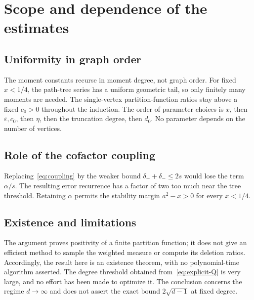 \documentclass[11pt]{article}
\numberwithin{equation}{section}
\theoremstyle{remark}
\begin{document}
\section{Scope and dependence of the estimates}

\subsection{Uniformity in graph order}
The moment constants recurse in moment degree, not graph order.
For fixed $x<1/4$, the path-tree series has a uniform geometric tail,
so only finitely many moments are needed. The single-vertex
partition-function ratios stay above a fixed $c_0>0$ throughout the
induction. The order of parameter choices is
$x$, then $\varepsilon,c_0$, then $\eta$, then the truncation degree,
then $d_0$. No parameter depends on the number of vertices.

\subsection{Role of the cofactor coupling}
Replacing~\eqref{eq:coupling} by the weaker bound
$\delta_++\delta_-\le2s$ would lose the term $\alpha/s$.
The resulting error recurrence has a factor of two too much near
the tree threshold. Retaining $\alpha$ permits the stability margin
$a^2-x>0$ for every $x<1/4$.



\subsection{Existence and limitations}

The argument proves positivity of a finite partition function; it
does not give an efficient method to sample the weighted measure
or compute its deletion ratios. Accordingly, the result here is
an existence theorem, with no polynomial-time algorithm asserted.
The degree threshold obtained from~\eqref{eq:explicit-Q} is very
large, and no effort has been made to optimize it.
The conclusion concerns the regime $d\to\infty$ and does not
assert the exact bound $2\sqrt{d-1}$ at fixed degree.
\end{document}
